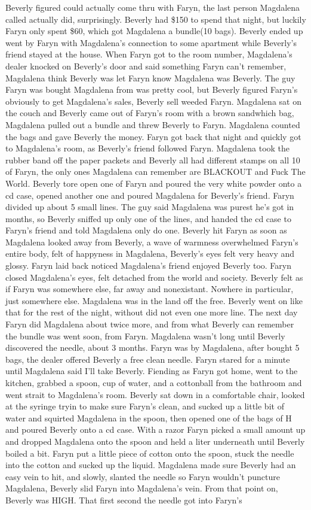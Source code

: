 \documentclass[12pt]{book}
\begin{document}
Beverly figured could actually come thru with Faryn, the last person Magdalena called actually did, surprisingly. Beverly had \$150 to spend that night, but luckily Faryn only spent \$60, which got Magdalena a bundle(10 bags). Beverly ended up went by Faryn with Magdalena's connection to some apartment while Beverly's friend stayed at the house. When Faryn got to the room number, Magdalena's dealer knocked on Beverly's door and said something Faryn can't remember, Magdalena think Beverly was let Faryn know Magdalena was Beverly. The guy Faryn was bought Magdalena from was pretty cool, but Beverly figured Faryn's obviously to get Magdalena's sales, Beverly sell weeded Faryn. Magdalena sat on the couch and Beverly came out of Faryn's room with a brown sandwhich bag, Magdalena pulled out a bundle and threw Beverly to Faryn. Magdalena counted the bags and gave Beverly the money. Faryn got back that night and quickly got to Magdalena's room, as Beverly's friend followed Faryn. Magdalena took the rubber band off the paper packets and Beverly all had different stamps on all 10 of Faryn, the only ones Magdalena can remember are BLACKOUT and Fuck The World. Beverly tore open one of Faryn and poured the very white powder onto a cd case, opened another one and poured Magdalena for Beverly's friend. Faryn divided up about 5 small lines. The guy said Magdalena was purest he's got in months, so Beverly sniffed up only one of the lines, and handed the cd case to Faryn's friend and told Magdalena only do one. Beverly hit Faryn as soon as Magdalena looked away from Beverly, a wave of warmness overwhelmed Faryn's entire body, felt of happyness in Magdalena, Beverly's eyes felt very heavy and glossy. Faryn laid back noticed Magdalena's friend enjoyed Beverly too. Faryn closed Magdalena's eyes, felt detached from the world and society. Beverly felt as if Faryn was somewhere else, far away and nonexistant. Nowhere in particular, just somewhere else. Magdalena was in the land off the free. Beverly went on like that for the rest of the night, without did not even one more line. The next day Faryn did Magdalena about twice more, and from what Beverly can remember the bundle was went soon, from Faryn. Magdalena wasn't long until Beverly discovered the needle, about 3 months. Faryn was by Magdalena, after bought 5 bags, the dealer offered Beverly a free clean needle. Faryn stared for a minute until Magdalena said I'll take Beverly. Fiending as Faryn got home, went to the kitchen, grabbed a spoon, cup of water, and a cottonball from the bathroom and went strait to Magdalena's room. Beverly sat down in a comfortable chair, looked at the syringe tryin to make sure Faryn's clean, and sucked up a little bit of water and squirted Magdalena in the spoon, then opened one of the bags of H and poured Beverly onto a cd case. With a razor Faryn picked a small amount up and dropped Magdalena onto the spoon and held a liter underneath until Beverly boiled a bit. Faryn put a little piece of cotton onto the spoon, stuck the needle into the cotton and sucked up the liquid. Magdalena made sure Beverly had an easy vein to hit, and slowly, slanted the needle so Faryn wouldn't puncture Magdalena, Beverly slid Faryn into Magdalena's vein. From that point on, Beverly was HIGH. That first second the needle got into Faryn's 
\end{document}
